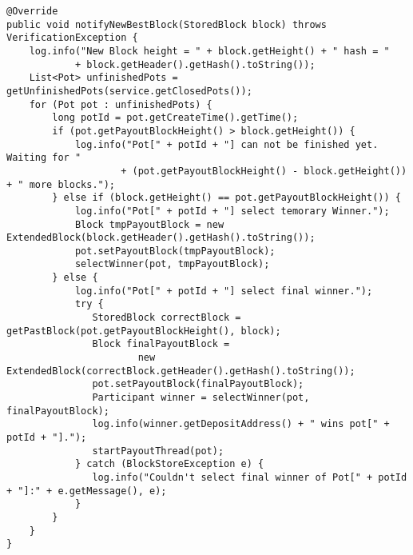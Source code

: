 \begin{lstlisting}
@Override
public void notifyNewBestBlock(StoredBlock block) throws VerificationException {
    log.info("New Block height = " + block.getHeight() + " hash = "
            + block.getHeader().getHash().toString());
    List<Pot> unfinishedPots = getUnfinishedPots(service.getClosedPots());
    for (Pot pot : unfinishedPots) {
        long potId = pot.getCreateTime().getTime();
        if (pot.getPayoutBlockHeight() > block.getHeight()) {
            log.info("Pot[" + potId + "] can not be finished yet. Waiting for "
                    + (pot.getPayoutBlockHeight() - block.getHeight()) + " more blocks.");
        } else if (block.getHeight() == pot.getPayoutBlockHeight()) {
            log.info("Pot[" + potId + "] select temorary Winner.");
            Block tmpPayoutBlock = new ExtendedBlock(block.getHeader().getHash().toString());
            pot.setPayoutBlock(tmpPayoutBlock);
            selectWinner(pot, tmpPayoutBlock);
        } else {
            log.info("Pot[" + potId + "] select final winner.");
            try {
               StoredBlock correctBlock = getPastBlock(pot.getPayoutBlockHeight(), block);
               Block finalPayoutBlock =
                       new ExtendedBlock(correctBlock.getHeader().getHash().toString());
               pot.setPayoutBlock(finalPayoutBlock);
               Participant winner = selectWinner(pot, finalPayoutBlock);
               log.info(winner.getDepositAddress() + " wins pot[" + potId + "].");
               startPayoutThread(pot);
            } catch (BlockStoreException e) {
               log.info("Couldn't select final winner of Pot[" + potId + "]:" + e.getMessage(), e);
            }
        }
    }
}
\end{lstlisting}

